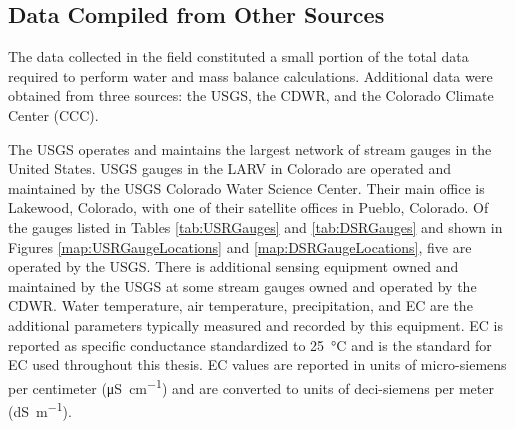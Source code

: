 \begin{linenumbers}
%

\clearpage{}
\section{Data Compiled from Other Sources}
\label{sec:data collected by other sources}
The data collected in the field constituted a small portion of the total data required to perform water and mass balance calculations.  Additional data were obtained from three sources: the USGS, the CDWR, and the Colorado Climate Center (CCC).

The USGS operates and maintains the largest network of stream gauges in the United States.  USGS gauges in the LARV in Colorado are operated and maintained by the USGS Colorado Water Science Center.  Their main office is Lakewood, Colorado, with one of their satellite offices in Pueblo, Colorado.  Of the gauges listed in Tables \ref{tab:USRGauges} and \ref{tab:DSRGauges} and shown in Figures \ref{map:USRGaugeLocations} and \ref{map:DSRGaugeLocations}, five are operated by the USGS.  There is additional sensing equipment owned and maintained by the USGS at some stream gauges owned and operated by the CDWR.  Water temperature, air temperature, precipitation, and EC are the additional parameters typically measured and recorded by this equipment.  EC is reported as specific conductance standardized to \SI{25}{\degreeCelsius} and is the standard for EC used throughout this thesis.  EC values are reported in units of micro-siemens per centimeter (\si{\micro\siemens\per\centi\meter}) and are converted to units of deci-siemens per meter (\si{\deci\siemens\per\meter}).


\end{linenumbers}
